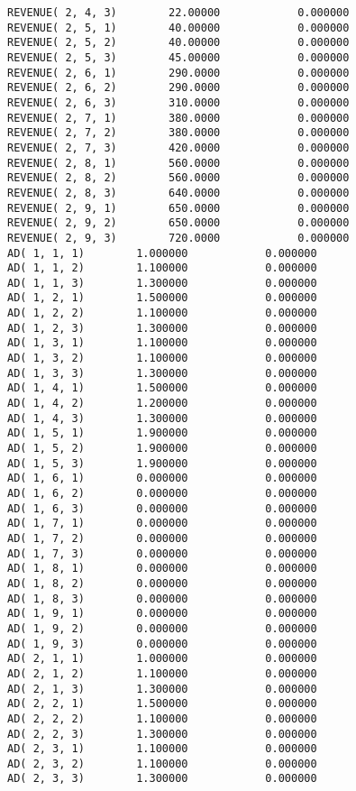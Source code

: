 \documentclass[12pt]{article}
\begin{document}
\begin{appendices}
\begin{lstlisting}
REVENUE( 2, 4, 3)        22.00000            0.000000
REVENUE( 2, 5, 1)        40.00000            0.000000
REVENUE( 2, 5, 2)        40.00000            0.000000
REVENUE( 2, 5, 3)        45.00000            0.000000
REVENUE( 2, 6, 1)        290.0000            0.000000
REVENUE( 2, 6, 2)        290.0000            0.000000
REVENUE( 2, 6, 3)        310.0000            0.000000
REVENUE( 2, 7, 1)        380.0000            0.000000
REVENUE( 2, 7, 2)        380.0000            0.000000
REVENUE( 2, 7, 3)        420.0000            0.000000
REVENUE( 2, 8, 1)        560.0000            0.000000
REVENUE( 2, 8, 2)        560.0000            0.000000
REVENUE( 2, 8, 3)        640.0000            0.000000
REVENUE( 2, 9, 1)        650.0000            0.000000
REVENUE( 2, 9, 2)        650.0000            0.000000
REVENUE( 2, 9, 3)        720.0000            0.000000
AD( 1, 1, 1)        1.000000            0.000000
AD( 1, 1, 2)        1.100000            0.000000
AD( 1, 1, 3)        1.300000            0.000000
AD( 1, 2, 1)        1.500000            0.000000
AD( 1, 2, 2)        1.100000            0.000000
AD( 1, 2, 3)        1.300000            0.000000
AD( 1, 3, 1)        1.100000            0.000000
AD( 1, 3, 2)        1.100000            0.000000
AD( 1, 3, 3)        1.300000            0.000000
AD( 1, 4, 1)        1.500000            0.000000
AD( 1, 4, 2)        1.200000            0.000000
AD( 1, 4, 3)        1.300000            0.000000
AD( 1, 5, 1)        1.900000            0.000000
AD( 1, 5, 2)        1.900000            0.000000
AD( 1, 5, 3)        1.900000            0.000000
AD( 1, 6, 1)        0.000000            0.000000
AD( 1, 6, 2)        0.000000            0.000000
AD( 1, 6, 3)        0.000000            0.000000
AD( 1, 7, 1)        0.000000            0.000000
AD( 1, 7, 2)        0.000000            0.000000
AD( 1, 7, 3)        0.000000            0.000000
AD( 1, 8, 1)        0.000000            0.000000
AD( 1, 8, 2)        0.000000            0.000000
AD( 1, 8, 3)        0.000000            0.000000
AD( 1, 9, 1)        0.000000            0.000000
AD( 1, 9, 2)        0.000000            0.000000
AD( 1, 9, 3)        0.000000            0.000000
AD( 2, 1, 1)        1.000000            0.000000
AD( 2, 1, 2)        1.100000            0.000000
AD( 2, 1, 3)        1.300000            0.000000
AD( 2, 2, 1)        1.500000            0.000000
AD( 2, 2, 2)        1.100000            0.000000
AD( 2, 2, 3)        1.300000            0.000000
AD( 2, 3, 1)        1.100000            0.000000
AD( 2, 3, 2)        1.100000            0.000000
AD( 2, 3, 3)        1.300000            0.000000

\end{lstlisting}
\end{appendices}
\end{document}
